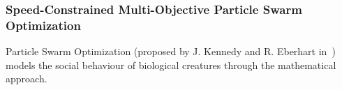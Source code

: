 \documentclass[10pt,journal,compsoc]{IEEEtran}
\begin{document}



\subsubsection{Speed-Constrained Multi-Objective Particle Swarm Optimization}
Particle Swarm Optimization (proposed by J. Kennedy and R. Eberhart in~\cite{poli2017}) models the social behaviour of biological creatures through the mathematical approach.
\end{document}
